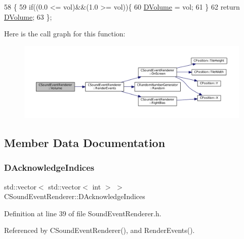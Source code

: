 \begin{DoxyCode}
58                              \{
59             \textcolor{keywordflow}{if}((0.0 <= vol)&&(1.0 >= vol))\{
60                 \hyperlink{classCSoundEventRenderer_a3812aeb93aef90635a7da72fc101c686}{DVolume} = vol;   
61             \}
62             \textcolor{keywordflow}{return} \hyperlink{classCSoundEventRenderer_a3812aeb93aef90635a7da72fc101c686}{DVolume};
63         \};
\end{DoxyCode}
Here is the call graph for this function\+:\nopagebreak
\begin{figure}[H]
\begin{center}
\leavevmode
\includegraphics[width=350pt]{classCSoundEventRenderer_a7266c3416291f3802d6f3476a29285a2_cgraph}
\end{center}
\end{figure}


\subsection{Member Data Documentation}
\hypertarget{classCSoundEventRenderer_ad52a927e172ab9a00dbf1f707e1fb724}{}\label{classCSoundEventRenderer_ad52a927e172ab9a00dbf1f707e1fb724} 
\subsubsection{\texorpdfstring{D\+Acknowledge\+Indices}{DAcknowledgeIndices}}
{\footnotesize\ttfamily std\+::vector$<$ std\+::vector$<$ int $>$ $>$ C\+Sound\+Event\+Renderer\+::\+D\+Acknowledge\+Indices\hspace{0.3cm}{\ttfamily [protected]}}



Definition at line 39 of file Sound\+Event\+Renderer.\+h.



Referenced by C\+Sound\+Event\+Renderer(), and Render\+Events().

